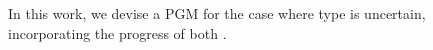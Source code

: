 \documentclass[12pt, onecolumn]{emulateapj}
\newcommand{\textul}{\underline}
\begin{document}
In this work, we devise a PGM for the case where type is uncertain, incorporating the progress of both \citet{Kunz07, Mandel16}.
%
\end{document}
